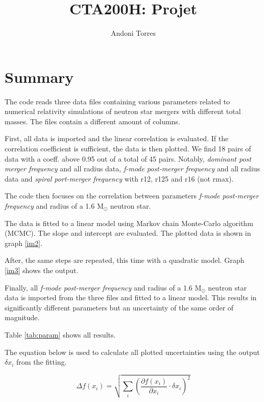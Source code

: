 \documentclass[a4paper,11pt]{article}
\begin{document}
\title{CTA200H: Projet}
\author{Andoni Torres}
\def\studyno{18/05/2018}

\maketitle

\section{Summary}

The code reads three data files containing various parameters related to numerical relativity simulations of neutron star mergers with different total masses. The files contain a different amount of columns.

First, all data is imported and the linear correlation is evaluated. If the correlation coefficient is sufficient, the data is then plotted. We find 18 pairs of data with a coeff. above 0.95 out of a total of 45 pairs. Notably, \textit{dominant post merger frequency}  and all radius data, \textit{f-mode post-merger frequency} and all radius data and \textit{spiral port-merger frequency} with r12, r125 and r16 (not rmax).

The code then focuses on the correlation between parameters \textit{f-mode post-merger frequency} and radius of a 1.6 M$_\odot$ neutron star. 

The data is fitted to a linear model using Markov chain Monte-Carlo algorithm (MCMC). The slope and intercept are evaluated. The plotted data is shown in graph \ref{im2}.

After, the same steps are repeated, this time with a quadratic model. Graph \ref{im3} shows the output.

Finally, all  \textit{f-mode post-merger frequency} and radius of a 1.6 M$_\odot$ neutron star data is imported from the three files and fitted to a linear model. This results in significantly different parameters but an uncertainty of the same order of magnitude.

Table \ref{tab:param} shows all results.

The equation below is used to calculate all plotted uncertainties using the output $\delta x_i$ from the fitting.

\begin{equation*}
    \Delta f(x_i) = \sqrt{ \sum_i \left( \frac{\partial f(x_i)}{\partial x_i} \cdot \delta x_i\right)^2}
    \label{eq1}
\end{equation*}
\end{document}
